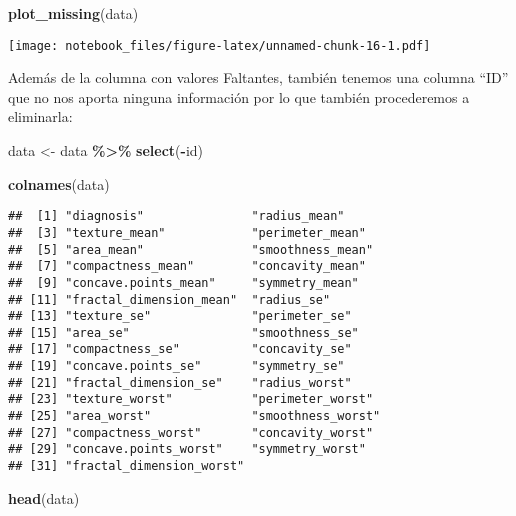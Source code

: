 \documentclass[
]{article}
\newenvironment{Shaded}{\begin{snugshade}}{\end{snugshade}}
\newcommand{\FunctionTok}[1]{\textcolor[rgb]{0.13,0.29,0.53}{\textbf{#1}}}
\newcommand{\NormalTok}[1]{#1}
\newcommand{\OtherTok}[1]{\textcolor[rgb]{0.56,0.35,0.01}{#1}}
\newcommand{\SpecialCharTok}[1]{\textcolor[rgb]{0.81,0.36,0.00}{\textbf{#1}}}
\begin{document}
\begin{Shaded}
\begin{Highlighting}[]
\FunctionTok{plot\_missing}\NormalTok{(data)}
\end{Highlighting}
\end{Shaded}

\texttt{[image: notebook\_files/figure-latex/unnamed-chunk-16-1.pdf]}

Además de la columna con valores Faltantes, también tenemos una columna
``ID'' que no nos aporta ninguna información por lo que también
procederemos a eliminarla:

\begin{Shaded}
\begin{Highlighting}[]
\NormalTok{data }\OtherTok{\textless{}{-}}\NormalTok{ data }\SpecialCharTok{\%\textgreater{}\%} \FunctionTok{select}\NormalTok{(}\SpecialCharTok{{-}}\NormalTok{id)}
\end{Highlighting}
\end{Shaded}

\begin{Shaded}
\begin{Highlighting}[]
\FunctionTok{colnames}\NormalTok{(data)}
\end{Highlighting}
\end{Shaded}

\begin{verbatim}
##  [1] "diagnosis"               "radius_mean"            
##  [3] "texture_mean"            "perimeter_mean"         
##  [5] "area_mean"               "smoothness_mean"        
##  [7] "compactness_mean"        "concavity_mean"         
##  [9] "concave.points_mean"     "symmetry_mean"          
## [11] "fractal_dimension_mean"  "radius_se"              
## [13] "texture_se"              "perimeter_se"           
## [15] "area_se"                 "smoothness_se"          
## [17] "compactness_se"          "concavity_se"           
## [19] "concave.points_se"       "symmetry_se"            
## [21] "fractal_dimension_se"    "radius_worst"           
## [23] "texture_worst"           "perimeter_worst"        
## [25] "area_worst"              "smoothness_worst"       
## [27] "compactness_worst"       "concavity_worst"        
## [29] "concave.points_worst"    "symmetry_worst"         
## [31] "fractal_dimension_worst"
\end{verbatim}

\begin{Shaded}
\begin{Highlighting}[]
\FunctionTok{head}\NormalTok{(data)}
\end{Highlighting}
\end{Shaded}
\end{document}

